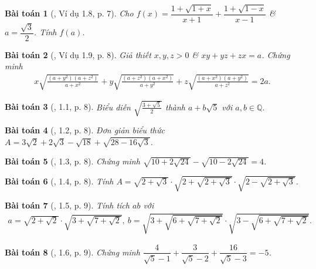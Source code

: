 \documentclass{article}
\newtheorem{baitoan}{Bài toán}
\begin{document}
\begin{baitoan}[\cite{TLCT_THCS_Toan_9_dai_so}, Ví dụ 1.8, p. 7]
	Cho $f(x) = \dfrac{1 + \sqrt{1 + x}}{x + 1} + \dfrac{1 + \sqrt{1 - x}}{x - 1}$ \& $a = \dfrac{\sqrt{3}}{2}$. Tính $f(a)$.
\end{baitoan}

\begin{baitoan}[\cite{TLCT_THCS_Toan_9_dai_so}, Ví dụ 1.9, p. 8]
	Giả thiết $x,y,z > 0$ \& $xy + yz + zx = a$. Chứng minh
	\begin{align*}
		x\sqrt{\frac{(a + y^2)(a + z^2)}{a + x^2}} + y\sqrt{\frac{(a + z^2)(a + x^2)}{a + y^2}} + z\sqrt{\frac{(a + x^2)(a + y^2)}{a + z^2}} = 2a.
	\end{align*}
\end{baitoan}

\begin{baitoan}[\cite{TLCT_THCS_Toan_9_dai_so}, 1.1, p. 8]
	Biểu diễn $\sqrt{\frac{3 + \sqrt{5}}{2}}$ thành $a + b\sqrt{5}$ với $a,b\in\mathbb{Q}$.
\end{baitoan}

\begin{baitoan}[\cite{TLCT_THCS_Toan_9_dai_so}, 1.2, p. 8]
	Đơn giản biểu thức $A = 3\sqrt{2} + 2\sqrt{3} - \sqrt{18} + \sqrt{28 - 16\sqrt{3}}$.
\end{baitoan}

\begin{baitoan}[\cite{TLCT_THCS_Toan_9_dai_so}, 1.3, p. 8]
	Chứng minh $\sqrt{10 + 2\sqrt{24}} - \sqrt{10 - 2\sqrt{24}} = 4$.
\end{baitoan}

\begin{baitoan}[\cite{TLCT_THCS_Toan_9_dai_so}, 1.4, p. 8]
	Tính $A = \sqrt{2 + \sqrt{3}}\cdot\sqrt{2 + \sqrt{2 + \sqrt{3}}}\cdot\sqrt{2 - \sqrt{2 + \sqrt{3}}}$.
\end{baitoan}

\begin{baitoan}[\cite{TLCT_THCS_Toan_9_dai_so}, 1.5, p. 9]
	Tính tích $ab$ với
	\begin{align*}
		a = \sqrt{2 + \sqrt{2}}\cdot\sqrt{3 + \sqrt{7 + \sqrt{2}}},\ b = \sqrt{3 + \sqrt{6 + \sqrt{7 + \sqrt{2}}}}\cdot\sqrt{3 - \sqrt{6 + \sqrt{7 + \sqrt{2}}}}.
	\end{align*}
\end{baitoan}

\begin{baitoan}[\cite{TLCT_THCS_Toan_9_dai_so}, 1.6, p. 9]
	Chứng minh $\dfrac{4}{\sqrt{5} - 1} + \dfrac{3}{\sqrt{5} - 2} + \dfrac{16}{\sqrt{5} - 3} = -5$.
\end{baitoan}
\end{document}
